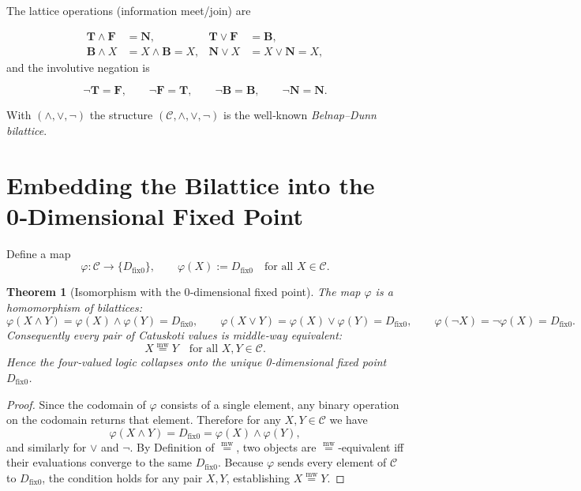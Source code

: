 \documentclass[12pt,a4paper]{article}
\newcommand{\dfix}{D_{\mathrm{fix}0}} %
\newcommand{\mw}{\mathrel{\overset{\mathrm{mw}}{=}}} %
\newcommand{\phiMap}{\varphi}            %
\newtheorem{theorem}{Theorem}[section]
\begin{document}
The lattice operations (information meet/join) are

$$
\begin{aligned}
\mathbf{T}\wedge\mathbf{F}&=\mathbf{N}, &
\mathbf{T}\vee\mathbf{F}&=\mathbf{B},\\
\mathbf{B}\wedge X&=X\wedge\mathbf{B}=X, &
\mathbf{N}\vee X&=X\vee\mathbf{N}=X,
\end{aligned}
$$
and the involutive negation is

$$
\neg\mathbf{T}=\mathbf{F},\qquad
\neg\mathbf{F}=\mathbf{T},\qquad
\neg\mathbf{B}=\mathbf{B},\qquad
\neg\mathbf{N}=\mathbf{N}.
$$

With $(\wedge,\vee,\neg)$ the structure
$(\mathcal{C},\wedge,\vee,\neg)$ is the well‑known
\emph{Belnap–Dunn bilattice}.

\section{Embedding the Bilattice into the 0‑Dimensional Fixed Point}

Define a map
\begin{equation}
\phiMap:\mathcal{C}\longrightarrow\{\dfix\},
\qquad
\phiMap(X):=\dfix\quad\text{for all }X\in\mathcal{C}.
\tag{1}
\end{equation}

\begin{theorem}[Isomorphism with the 0‑dimensional fixed point]
The map $\phiMap$ is a homomorphism of bilattices:
$$
\phiMap(X\wedge Y)=\phiMap(X)\wedge\phiMap(Y)=\dfix,
\qquad
\phiMap(X\vee Y)=\phiMap(X)\vee\phiMap(Y)=\dfix,
\qquad
\phiMap(\neg X)=\neg\phiMap(X)=\dfix .
$$
Consequently every pair of Catuskoti values is middle‑way equivalent:
$$
X\mw Y\quad\text{for all }X,Y\in\mathcal{C}.
$$
Hence the four‑valued logic collapses onto the unique
0‑dimensional fixed point $\dfix$.
\end{theorem}
\begin{proof}
Since the codomain of $\phiMap$ consists of a single element,
any binary operation on the codomain returns that element.
Therefore for any $X,Y\in\mathcal{C}$ we have
$$
\phiMap(X\wedge Y)=\dfix=\phiMap(X)\wedge\phiMap(Y),
$$
and similarly for $\vee$ and $\neg$.
By Definition of $\mw$, two objects are $\mw$‑equivalent
iff their evaluations converge to the same $\dfix$.
Because $\phiMap$ sends every element of $\mathcal{C}$ to $\dfix$,
the condition holds for any pair $X,Y$, establishing $X\mw Y$.
\end{proof}
\end{document}
